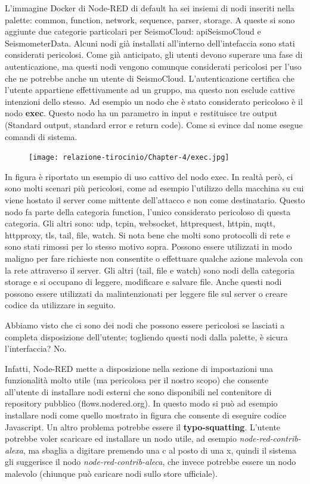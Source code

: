 \documentclass[a4paper,10pt]{memoir}
\begin{document}
L'immagine Docker di Node-RED di default ha sei insiemi di nodi inseriti nella palette: common, function, network, sequence, parser, storage.
A queste si sono aggiunte due categorie particolari per SeismoCloud: apiSeismoCloud e SeismometerData.
Alcuni nodi già installati all'interno dell'intefaccia sono stati considerati pericolosi.
Come già anticipato, gli utenti devono superare una fase di autenticazione, ma questi nodi vengono comunque considerati pericolosi per l'uso che ne potrebbe anche un utente di SeismoCloud. L'autenticazione certifica che l'utente appartiene effettivamente ad un gruppo, ma questo non esclude cattive intenzioni dello stesso.
Ad esempio un nodo che è stato considerato pericoloso è il nodo \textbf{exec}. Questo nodo ha un parametro in input e restituisce tre output (Standard output, standard error e return code). Come si evince dal nome esegue comandi di sistema. 
\begin{figure}[ht]
    \texttt{[image: relazione-tirocinio/Chapter-4/exec.jpg]}
    \label{fig:exec}
\end{figure}
In figura è riportato un esempio di uso cattivo del nodo exec. In realtà però, ci sono molti scenari più pericolosi, come ad esempio l'utilizzo della macchina su cui viene hostato il server come mittente dell'attacco e non come destinatario.
Questo nodo fa parte della categoria function, l'unico considerato pericoloso di questa categoria.
Gli altri sono: udp, tcpin, websocket, httprequest, httpin,
mqtt, httpproxy, tls, tail, file,
watch.
Si nota bene che molti sono protocolli di rete e sono stati rimossi per lo stesso motivo sopra. Possono essere utilizzati in modo maligno per fare richieste non consentite o effettuare qualche azione malevola con la rete attraverso il server.
Gli altri (tail, file e watch) sono nodi della categoria storage e si occupano di leggere, modificare e salvare file.
Anche questi nodi possono essere utilizzati da malintenzionati per leggere file sul server o creare codice da utilizzare in seguito.

Abbiamo visto che ci sono dei nodi che possono essere pericolosi se lasciati a completa disposizione dell'utente; togliendo questi nodi dalla palette, è sicura l'interfaccia? No.

Infatti, Node-RED mette a disposizione nella sezione di impostazioni una funzionalità molto utile (ma pericolosa per il nostro scopo) che consente all'utente di installare nodi esterni che sono disponibili nel contenitore di repository pubblico (flows.nodered.org).
In questo modo si può ad esempio installare nodi come quello mostrato in figura che consente di eseguire codice Javascript.
Un altro problema potrebbe essere il \textbf{typo-squatting}. L'utente potrebbe voler scaricare ed installare un nodo utile, ad esempio \textit{node-red-contrib-alexa}, ma sbaglia a digitare premendo una c al posto di una x, quindi il sistema gli suggerisce il nodo \textit{node-red-contrib-aleca}, che invece potrebbe essere un nodo malevolo (chiunque può caricare nodi sullo store ufficiale).
\end{document}
